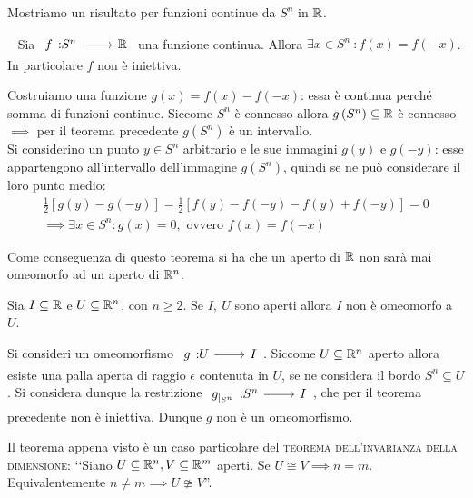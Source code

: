 Mostriamo un risultato per funzioni continue da $S^n$ in $\mathbb{R}$.
\begin{theorema}~{}\label{non iniettività S^n in realset}
	Sia $\funz f {S^n} \realset$ una funzione continua. Allora $\exists x\in S^n \ \colon f(x)=f(-x)$. In particolare $f$ non è iniettiva.
\end{theorema}
\begin{demonstration}
	Costruiamo una funzione $g(x)=f(x)-f(-x)$: essa è continua perché somma di funzioni continue. Siccome $S^n$ è connesso allora $g\left( S^n\right)\subseteq\mathbb{R}$ è connesso $\implies$ per il teorema precedente $g\left(S^n\right)$ è un intervallo.\\
	Si considerino un punto $y\in S^n$ arbitrario e le sue immagini $g(y)$ e $g(-y)$: esse appartengono all'intervallo dell'immagine $g\left( S^n\right)$, quindi se ne può considerare il loro punto medio:
		\begin{gather*}
			\frac{1}{2}\left[ g(y) - g(-y)\right]=\frac{1}{2} \left[ f(y) -f(-y) - f(y) +f(-y) \right]= 0\\
			\implies \exists x\in S^n \colon g(x)=0, \text{ ovvero } f(x)=f(-x)
		\end{gather*}
\end{demonstration}
Come conseguenza di questo teorema si ha che un aperto di $\mathbb{R}$ non sarà mai omeomorfo ad un aperto di $\mathbb{R}^n$.
\begin{theorema}
Sia $I\subseteq\mathbb{R}$ e $U\subseteq\mathbb{R}^n$, con $n\geq 2$. Se $I,\ U$ sono aperti allora $I$ non è omeomorfo a $U$.	
\end{theorema}	
\begin{demonstration}
	Si consideri un omeomorfismo $\funz g U I$. Siccome $U\subseteq\mathbb{R}^n$ aperto allora esiste una palla aperta di raggio $\epsilon$ contenuta in $U$, se ne considera il bordo $S^n\subseteq U$. Si considera dunque la restrizione $\funz {g_{|_{S^n}}} {S^n} I$, che per il teorema precedente non è iniettiva. Dunque $g$ non è un omeomorfismo.	
\end{demonstration}

\begin{observe}
	Il teorema appena visto è un caso particolare del \textsc{teorema dell'invarianza della dimensione}: ‘‘Siano $U\subseteq\mathbb{R}^n, V\subseteq\mathbb{R}^m$ aperti. Se $U\cong V \implies n=m$. Equivalentemente $n\neq m\implies U\ncong V$''.
\end{observe}
